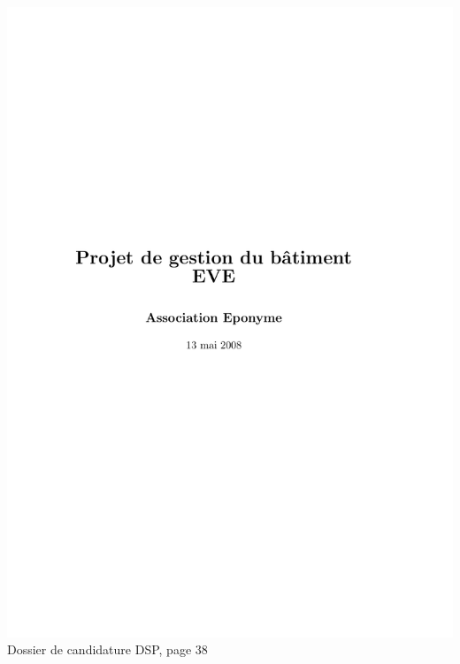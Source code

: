 \includegraphics[scale=0.85,trim=20mm 20mm 20mm 20mm,clip,page=38]{annexes/candidature_dsp.pdf} \\
Dossier de candidature DSP, page 38
\newpage
